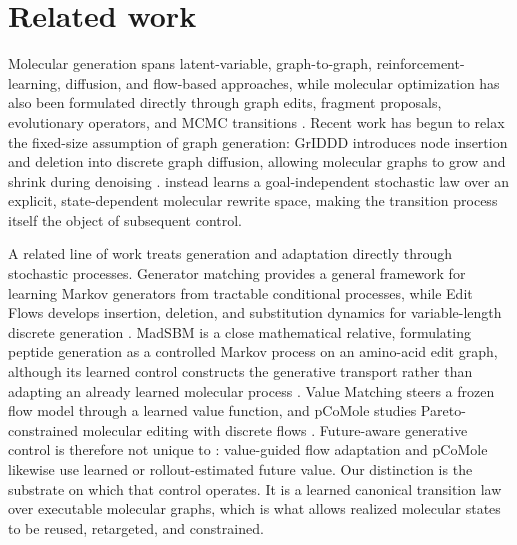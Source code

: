 \section{Related work}
\label{sec:related}

Molecular generation spans latent-variable, graph-to-graph, reinforcement-learning, diffusion, and flow-based approaches, while molecular optimization has also been formulated directly through graph edits, fragment proposals, evolutionary operators, and MCMC transitions \citep{gomezbombarelli2018chemvae,jin2018jtvae,jin2019vjtnn,zhou2019moldqn,jensen2019graphga,xie2021mars,fu2021mimosa,vignac2023digress,campbell2024multiflow}. Recent work has begun to relax the fixed-size assumption of graph generation: GrIDDD introduces node insertion and deletion into discrete graph diffusion, allowing molecular graphs to grow and shrink during denoising \citep{ninniri2025griddd}. \method{} instead learns a goal-independent stochastic law over an explicit, state-dependent molecular rewrite space, making the transition process itself the object of subsequent control.

A related line of work treats generation and adaptation directly through stochastic processes. Generator matching provides a general framework for learning Markov generators from tractable conditional processes, while Edit Flows develops insertion, deletion, and substitution dynamics for variable-length discrete generation \citep{holderrieth2025generator,havasi2025editflows}. MadSBM is a close mathematical relative, formulating peptide generation as a controlled Markov process on an amino-acid edit graph, although its learned control constructs the generative transport rather than adapting an already learned molecular process \citep{goel2026madsbm}. Value Matching steers a frozen flow model through a learned value function, and pCoMole studies Pareto-constrained molecular editing with discrete flows \citep{jensen2026valuematching,pcomole2026}. Future-aware generative control is therefore not unique to \method{}: value-guided flow adaptation and pCoMole likewise use learned or rollout-estimated future value. Our distinction is the substrate on which that control operates. It is a learned canonical transition law over executable molecular graphs, which is what allows realized molecular states to be reused, retargeted, and constrained.

